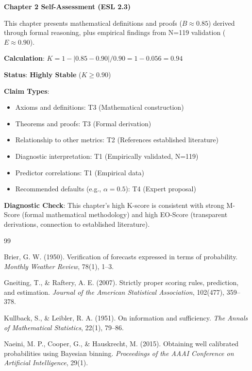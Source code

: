 \documentclass[11pt,a4paper]{article}
\theoremstyle{remark}
\begin{document}
\begin{eslbox}
\textbf{Chapter 2 Self-Assessment (ESL 2.3)}

This chapter presents mathematical definitions and proofs ($B \approx 0.85$) derived through formal reasoning, plus empirical findings from N=119 validation ($E \approx 0.90$).

\textbf{Calculation}: $K = 1 - |0.85 - 0.90| / 0.90 = 1 - 0.056 = 0.94$

\textbf{Status}: \textcolor{eslgreen}{\textbf{Highly Stable}} ($K \geq 0.90$)

\textbf{Claim Types}:
\begin{itemize}
    \item Axioms and definitions: T3 (Mathematical construction)
    \item Theorems and proofs: T3 (Formal derivation)
    \item Relationship to other metrics: T2 (References established literature)
    \item Diagnostic interpretation: T1 (Empirically validated, N=119)
    \item Predictor correlations: T1 (Empirical data)
    \item Recommended defaults (e.g., $\alpha = 0.5$): T4 (Expert proposal)
\end{itemize}

\textbf{Diagnostic Check}: This chapter's high K-score is consistent with strong M-Score (formal mathematical methodology) and high EO-Score (transparent derivations, connection to established literature).
\end{eslbox}


\newpage


\begin{thebibliography}{99}

Brier, G. W. (1950).
Verification of forecasts expressed in terms of probability.
\textit{Monthly Weather Review}, 78(1), 1--3.

Gneiting, T., \& Raftery, A. E. (2007).
Strictly proper scoring rules, prediction, and estimation.
\textit{Journal of the American Statistical Association}, 102(477), 359--378.

Kullback, S., \& Leibler, R. A. (1951).
On information and sufficiency.
\textit{The Annals of Mathematical Statistics}, 22(1), 79--86.

Naeini, M. P., Cooper, G., \& Hauskrecht, M. (2015).
Obtaining well calibrated probabilities using Bayesian binning.
\textit{Proceedings of the AAAI Conference on Artificial Intelligence}, 29(1).

\end{thebibliography}
\end{document}
